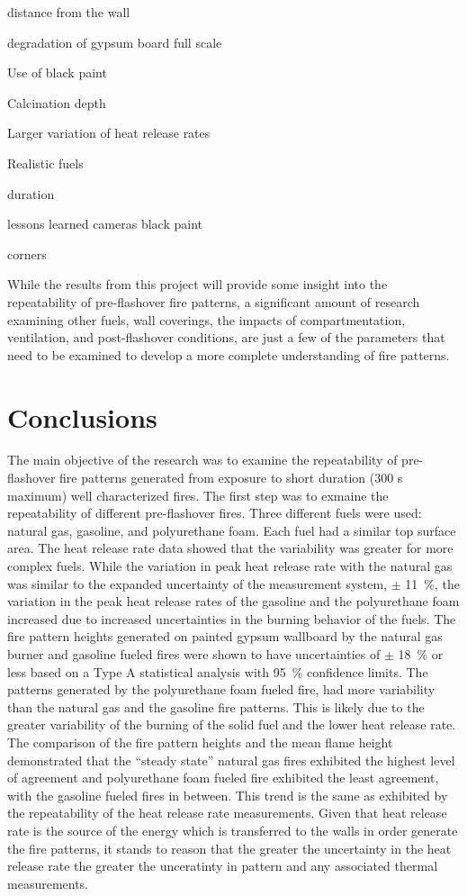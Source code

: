 \documentclass[twoside]{uocthesis}
\begin{document}
{distance from the wall

degradation of gypsum board full scale

Use of black paint

Calcination depth

Larger variation of heat release rates

Realistic fuels

duration

lessons learned  cameras   black paint

corners

While the results from this project will provide some insight into the repeatability of pre-flashover fire patterns, a significant amount of research examining other fuels, wall coverings, the impacts of compartmentation, ventilation, and post-flashover conditions, are just a few of the parameters that need to be examined to develop a more complete understanding of fire patterns.          




\chapter{Conclusions}

The main objective of the research was to examine the repeatability of pre-flashover fire patterns generated from exposure to short duration (300 s maximum) well characterized fires.  The first step was to exmaine the repeatability of different pre-flashover fires.  Three different fuels were used: natural gas, gasoline, and polyurethane foam.  Each fuel had a similar top surface area.  The heat release rate data showed that the variability was greater for more complex fuels.  While the variation in peak heat release rate with the natural gas was similar to the expanded uncertainty of the measurement system, $\pm$ 11~\%, the variation in the peak heat release rates of the gasoline and the polyurethane foam increased due to increased uncertainties in the burning behavior of the fuels.  The fire pattern heights generated on painted gypsum wallboard by the natural gas burner and gasoline fueled fires were shown to have uncertainties of $\pm$ 18~\% or less based on a Type A statistical analysis with 95~\% confidence limits. The patterns generated by the polyurethane foam fueled fire, had more variability than the natural gas and the gasoline fire patterns.  This is likely due to the greater variability of the burning of the solid fuel and the lower heat release rate.    The comparison of the fire pattern heights and the mean flame height demonstrated that the “steady state” natural gas fires exhibited the highest level of agreement and polyurethane foam fueled fire exhibited the least agreement, with the gasoline fueled fires in between.  This trend is the same as exhibited by the repeatability of the heat release rate measurements.  Given that heat release rate is the source of the energy which is transferred to the walls in order generate the fire patterns, it stands to reason that the greater the uncertainty in the heat release rate the greater the unceratinty in pattern and any associated thermal measurements.  

}
\end{document}

